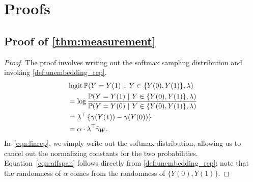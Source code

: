 \documentclass{article}
\theoremstyle{plain}
\theoremstyle{definition}
\theoremstyle{remark}
\begin{document}
\section{Proofs}\label{sec:proofs}

\subsection{Proof of \cref{thm:measurement}}
\measRep*
\begin{proof}
    The proof involves writing out the softmax sampling distribution and invoking \cref{def:unembedding_rep}.
    \begin{align}
        &\logit \Pr(Y=Y(1) \given Y\in\{Y(0), Y(1)\}, \lambda) \\
        &= \log \frac{ \Pr(Y=Y(1) \mid Y \in \{Y(0), Y(1)\}, \lambda) }{ \Pr(Y=Y(0) \mid Y \in \{Y(0), Y(1)\}, \lambda) } \\
        &= \lambda^\top \left\{ \gamma(Y(1)) - \gamma(Y(0)) \right\} \label{eqn:linrep} \\
        &= \alpha \cdot \lambda^\top \bar\gamma_W. \label{eqn:affspan}
    \end{align}
    In~\eqref{eqn:linrep}, we simply write out the softmax distribution, allowing us to cancel out the normalizing constants for the two probabilities. 
    Equation~\eqref{eqn:affspan} follows directly from \cref{def:unembedding_rep}; note that the randomness of $\alpha$ comes from the randomness of $\{Y(0), Y(1)\}$.
\end{proof}
\end{document}
